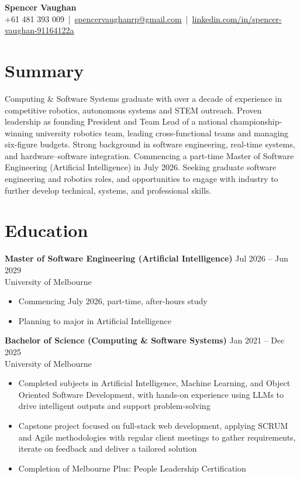 \documentclass[11pt]{article}
\begin{document}
\begin{center}
{\LARGE \textbf{Spencer Vaughan}}\\
+61 481 393 009 \,|\, 
\href{mailto:spencervaughanrp@gmail.com}{spencervaughanrp@gmail.com} \,|\, 
\href{https://linkedin.com/in/spencer-vaughan-91164122a}{linkedin.com/in/spencer-vaughan-91164122a}
\end{center}

\section*{Summary}

Computing \& Software Systems graduate with over a decade of experience in competitive robotics, autonomous systems and STEM outreach. Proven leadership as founding President and Team Lead of a national championship-winning university robotics team, leading cross-functional teams and managing six-figure budgets. Strong background in software engineering, real-time systems, and hardware–software integration. Commencing a part-time Master of Software Engineering (Artificial Intelligence) in July 2026. Seeking graduate software engineering and robotics roles, and opportunities to engage with industry to further develop technical, systems, and professional skills.

\section*{Education}

\textbf{Master of Software Engineering (Artificial Intelligence)} \hfill Jul 2026 -- Jun 2029\\
University of Melbourne
\begin{itemize}
\item Commencing July 2026, part-time, after-hours study
\item Planning to major in Artificial Intelligence
\end{itemize}

\textbf{Bachelor of Science (Computing \& Software Systems)} \hfill Jan 2021 -- Dec 2025\\
University of Melbourne
\begin{itemize}
\item Completed subjects in Artificial Intelligence, Machine Learning, and Object Oriented Software Development, with hands-on experience using LLMs to drive intelligent outputs and support problem-solving
\item Capstone project focused on full-stack web development, applying SCRUM and Agile methodologies with regular client meetings to gather requirements, iterate on feedback and deliver a tailored solution
\item Completion of Melbourne Plus: People Leadership Certification
\end{itemize}
\end{document}
